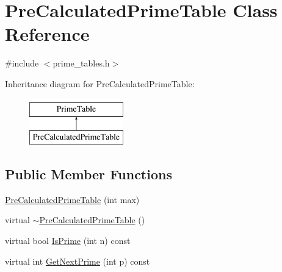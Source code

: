 \hypertarget{class_pre_calculated_prime_table}{\section{Pre\-Calculated\-Prime\-Table Class Reference}
\label{class_pre_calculated_prime_table}
}


{\ttfamily \#include $<$prime\-\_\-tables.\-h$>$}

Inheritance diagram for Pre\-Calculated\-Prime\-Table\-:\begin{figure}[H]
\begin{center}
\leavevmode
\includegraphics[height=2.000000cm]{class_pre_calculated_prime_table}
\end{center}
\end{figure}
\subsection*{Public Member Functions}
\begin{DoxyCompactItemize}
\item 
\hyperlink{class_pre_calculated_prime_table_a6bb947504421e31da70d2c71576be350}{Pre\-Calculated\-Prime\-Table} (int max)
\item 
virtual \hyperlink{class_pre_calculated_prime_table_a6ceab295f80dbe2766b8d4f54138bbc4}{$\sim$\-Pre\-Calculated\-Prime\-Table} ()
\item 
virtual bool \hyperlink{class_pre_calculated_prime_table_ae3d0da99f18f4b57d8d63ecebfd65106}{Is\-Prime} (int n) const 
\item 
virtual int \hyperlink{class_pre_calculated_prime_table_a405c77ebe22cd11d7782ea264502ed39}{Get\-Next\-Prime} (int p) const 
\end{DoxyCompactItemize}


